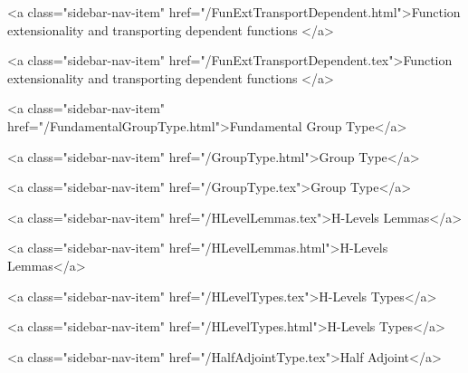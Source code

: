       
    
      
        
          <a class="sidebar-nav-item" href="/FunExtTransportDependent.html">Function extensionality and transporting dependent functions </a>
        
      
    
      
        
          <a class="sidebar-nav-item" href="/FunExtTransportDependent.tex">Function extensionality and transporting dependent functions </a>
        
      
    
      
        
          <a class="sidebar-nav-item" href="/FundamentalGroupType.html">Fundamental Group Type</a>
        
      
    
      
        
          <a class="sidebar-nav-item" href="/GroupType.html">Group Type</a>
        
      
    
      
        
          <a class="sidebar-nav-item" href="/GroupType.tex">Group Type</a>
        
      
    
      
        
          <a class="sidebar-nav-item" href="/HLevelLemmas.tex">H-Levels Lemmas</a>
        
      
    
      
        
          <a class="sidebar-nav-item" href="/HLevelLemmas.html">H-Levels Lemmas</a>
        
      
    
      
        
          <a class="sidebar-nav-item" href="/HLevelTypes.tex">H-Levels Types</a>
        
      
    
      
        
          <a class="sidebar-nav-item" href="/HLevelTypes.html">H-Levels Types</a>
        
      
    
      
        
          <a class="sidebar-nav-item" href="/HalfAdjointType.tex">Half Adjoint</a>
        
      
    
      
        
